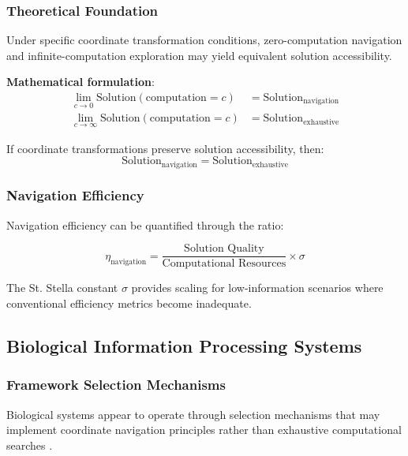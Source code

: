\documentclass[11pt]{article}
\begin{document}
\subsubsection{Theoretical Foundation}

 Under specific coordinate transformation conditions, zero-computation navigation and infinite-computation exploration may yield equivalent solution accessibility.

\textbf{Mathematical formulation}:
\begin{align}
\lim_{c \to 0} \text{Solution}(\text{computation} = c) &= \text{Solution}_{\text{navigation}} \\
\lim_{c \to \infty} \text{Solution}(\text{computation} = c) &= \text{Solution}_{\text{exhaustive}}
\label{eq:computational_equivalence}
\end{align}

If coordinate transformations preserve solution accessibility, then:
\begin{equation}
\text{Solution}_{\text{navigation}} = \text{Solution}_{\text{exhaustive}}
\label{eq:navigation_exhaustive_equivalence}
\end{equation}

\subsubsection{Navigation Efficiency}

Navigation efficiency can be quantified through the ratio:

\begin{equation}
\eta_{\text{navigation}} = \frac{\text{Solution Quality}}{\text{Computational Resources}} \times \sigma
\label{eq:navigation_efficiency}
\end{equation}

The St. Stella constant $\sigma$ provides scaling for low-information scenarios where conventional efficiency metrics become inadequate.

\subsection{Biological Information Processing Systems}

\subsubsection{Framework Selection Mechanisms}

Biological systems appear to operate through selection mechanisms that may implement coordinate navigation principles rather than exhaustive computational searches \cite{friston2010free, clark2013whatever}.
\end{document}
